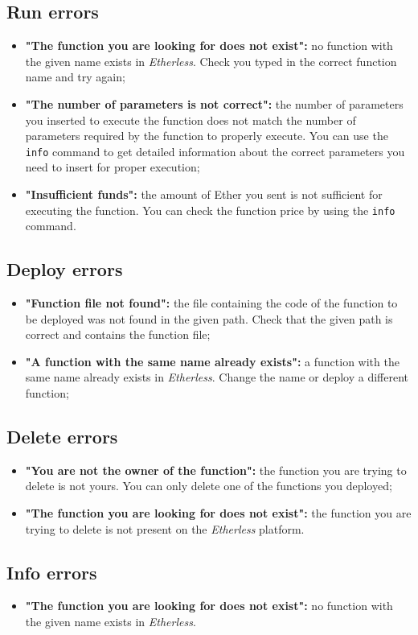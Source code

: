   \subsection{Run errors}
  \begin{itemize}
    \item \textbf{"The function you are looking for does not exist":} no function with the given name exists in \textit{Etherless}. Check you typed in the correct function name and try again;
     \item \textbf{"The number of parameters is not correct":} the number of parameters you inserted to execute the function does not match the number of parameters required by the function to properly execute. You can use the \texttt{info} command to get detailed information about the correct parameters you need to insert for proper execution;
      \item \textbf{"Insufficient funds":} the amount of Ether you sent is not sufficient for executing the function. You can check the function price by using the \texttt{info} command.
  \end{itemize}
  \subsection{Deploy errors}
  \begin{itemize}
    \item \textbf{"Function file not found":} the file containing the code of the function to be deployed was not found in the given path. Check that the given path is correct and contains the function file;
    \item \textbf{"A function with the same name already exists":} a function with the same name already exists in \textit{Etherless}. Change the name or deploy a different function;
  \end{itemize}
  \subsection{Delete errors}
  \begin{itemize}
    \item \textbf{"You are not the owner of the function":} the function you are trying to delete is not yours. You can only delete one of the functions you deployed;
    \item \textbf{"The function you are looking for does not exist":} the function you are trying to delete is not present on the \textit{Etherless} platform.
  \end{itemize}
  \subsection{Info errors}
  \begin{itemize}
    \item \textbf{"The function you are looking for does not exist":} no function with the given name exists in \textit{Etherless}.
  \end{itemize}
